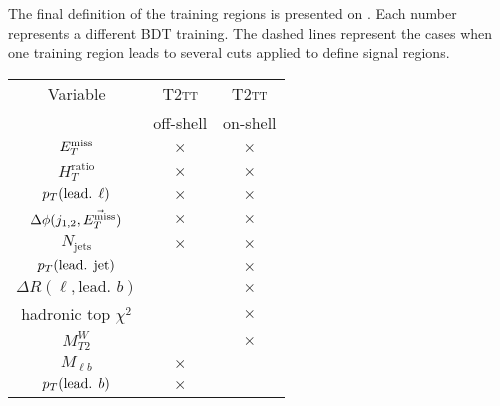    The final definition of the training regions is presented on
    .  Each number represents a different BDT
    training. The dashed lines represent the cases when one training region
    leads to several cuts applied to define signal regions.

    \begin{table}[h!]
        \begin{center}
            \begin{tabular}{|c|cc|}

                \hline
                Variable                            & \textsc{T2tt} & \textsc{T2tt} \\
                                                    & off-shell     & on-shell      \\
                \hline
                $E_T^\text{miss}$                              & $\times$      & $\times$      \\
                $H_{T}^\text{ratio}$                & $\times$      & $\times$      \\
                $p_T(\text{lead. } \ell)$           & $\times$      & $\times$      \\
                $\Delta\phi(j_{1,2},\vec{E_T^\text{miss}})$    & $\times$      & $\times$      \\
                $N_\text{jets}$                     & $\times$      & $\times$      \\
                $p_T(\text{lead. jet})$             &               & $\times$      \\
                $\Delta R( \ell, \text{lead. } b)$  &               & $\times$      \\
                hadronic top $\chi^2$               &               & $\times$      \\
                $M_{T2}^W$                          &               & $\times$      \\
                $M_{\ell b}$                        & $\times$      &               \\
                $p_T(\text{lead. } b)$              & $\times$      &               \\
                \hline
            \end{tabular}
            \begin{tabular}{|c|ccc|}


\end{tabular}
\end{center}
\end{table}
